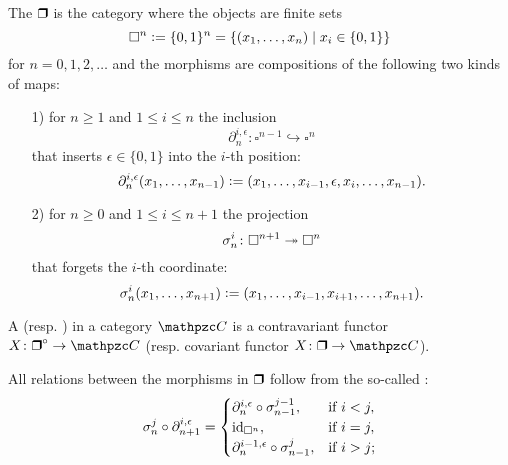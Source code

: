 \begin{definition}
  \label{dfn:cubical-objects}
  The  $\bsquare$ is the category where the objects are
  finite sets
  $$\square^n \mathrel{\mathop:}= \{ 0,1 \}^n = \{ (x_1, \ldots, x_n) \mid x_i \in \{ 0,1 \} \}$$
  for $n = 0, 1, 2, \ldots$ and the morphisms are compositions of the following
  two kinds of maps:

  \begin{enumerate}
  \item[1)] for $n \ge 1$ and $1 \le i \le n$ the inclusion
    $$\partial^{i,\epsilon}_n\colon \square^{n-1} \hookrightarrow \square^n$$
    that inserts $\epsilon \in \{ 0,1 \}$ into the $i$-th position:
    \begin{equation}
      \label{eqn:cubical-category-inclusions}
      \partial^{i,\epsilon}_n (x_1, \ldots, x_{n-1}) \mathrel{\mathop:}=
      (x_1, \ldots, x_{i-1}, \epsilon, x_i, \ldots, x_{n-1}).
    \end{equation}

  \item[2)] for $n \ge 0$ and $1 \le i \le n+1$ the projection
    $$\sigma_n^i\colon \square^{n+1} \twoheadrightarrow \square^n$$
    that forgets the $i$-th coordinate:
    \begin{equation}
      \label{eqn:cubical-category-projections}
      \sigma_n^i (x_1, \ldots, x_{n+1}) \mathrel{\mathop:}=
      (x_1, \ldots, x_{i-1}, x_{i+1}, \ldots, x_{n+1}).
    \end{equation}
  \end{enumerate}

  A  (resp. )  in a category
  $\vcateg{C}$ is a contravariant functor
  $X\colon \bsquare^\circ \to \vcateg{C}$
  (resp. covariant functor $X\colon \bsquare \to \vcateg{C}$).
\end{definition}

All relations between the morphisms in $\bsquare$ follow from the so-called
:
\begin{equation}
  \label{eqn:cocubical-identity-1}
  \sigma^j_n \circ \partial^{i,\epsilon}_{n+1}
  = \begin{cases}
    \partial^{i,\epsilon}_n \circ \sigma^{j-1}_{n-1}, & \text{if }i < j, \\
    \mathrm{id}_{\square^n}, & \text{if }i = j, \\
    \partial^{i-1,\epsilon}_n \circ \sigma^j_{n-1}, & \text{if }i > j;
  \end{cases}
\end{equation}

